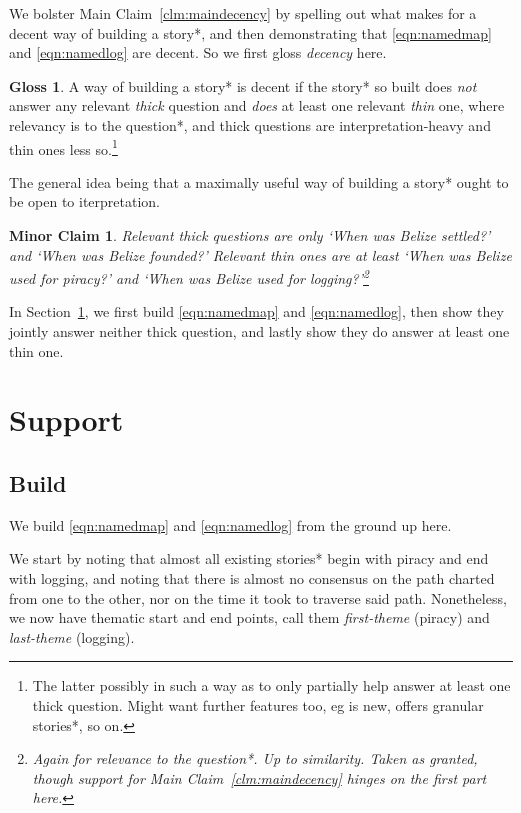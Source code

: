 \documentclass{amsart}
\newcommand{\ment}{\textit} %
\newtheorem{minrclm}{Minor Claim} %
\theoremstyle{definition}
\newtheorem{gloss}{Gloss} %
\theoremstyle{remark}
\begin{document}
	We bolster Main Claim~\ref{clm:maindecency} by spelling out what makes for a decent way of building a story*, and then demonstrating that \ref{eqn:namedmap} and \ref{eqn:namedlog} are decent. So we first gloss \ment{decency} here.
	\begin{gloss}
	\label{gloss:decency}
		A way of building a story* is decent if the story* so built does \emph{not} answer any relevant \ment{thick} question and \emph{does} at least one relevant \ment{thin} one, where relevancy is to the question*, and thick questions are interpretation-heavy and thin ones less so.\footnote{The latter possibly in such a way as to only partially help answer at least one thick question. Might want further features too, eg is new, offers granular stories*, so on.}
	\end{gloss}
	The general idea being that a maximally useful way of building a story* ought to be open to iterpretation.
	\begin{minrclm}
	\label{clm:minorquestions}
	Relevant thick questions are only `When was Belize settled?' and `When was Belize founded?' Relevant thin ones are at least `When was Belize used for piracy?' and `When was Belize used for logging?'\footnote{Again for relevance to the question*. Up to similarity. Taken as granted, though support for Main Claim~\ref{clm:maindecency} hinges on the first part here.}
	\end{minrclm}
	In Section~\ref{s:support}, we first build \ref{eqn:namedmap} and \ref{eqn:namedlog}, then show they jointly answer neither thick question, and lastly show they do answer at least one thin one.
%
%
%
\section{Support}
\label{s:support}
	\subsection{Build}
	\label{ss:build}
		We build \ref{eqn:namedmap} and \ref{eqn:namedlog} from the ground up here.
		
		We start by noting that almost all existing stories* begin with piracy and end with logging, and noting that there is almost no consensus on the path charted from one to the other, nor on the time it took to traverse said path. Nonetheless, we now have thematic start and end points, call them \ment{first-theme} (piracy) and \ment{last-theme} (logging).
		
\end{document}
